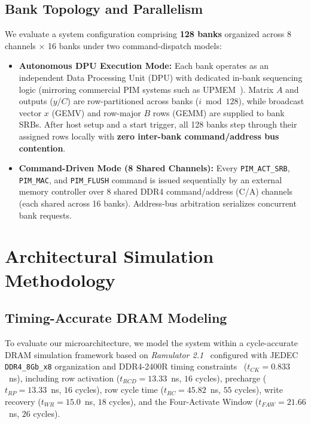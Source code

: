 \documentclass[conference]{IEEEtran}
\begin{document}
\subsection{Bank Topology and Parallelism}
We evaluate a system configuration comprising \textbf{128 banks} organized across 8 channels $\times$ 16 banks under two command-dispatch models:
\begin{itemize}
    \item \textbf{Autonomous DPU Execution Mode:} Each bank operates as an independent Data Processing Unit (DPU) with dedicated in-bank sequencing logic (mirroring commercial PIM systems such as UPMEM~\cite{devaux2019true}). Matrix $A$ and outputs ($y$/$C$) are row-partitioned across banks ($i \bmod 128$), while broadcast vector $x$ (GEMV) and row-major $B$ rows (GEMM) are supplied to bank SRBs. After host setup and a start trigger, all 128 banks step through their assigned rows locally with \textbf{zero inter-bank command/address bus contention}.
    \item \textbf{Command-Driven Mode (8 Shared Channels):} Every \texttt{PIM\_ACT\_SRB}, \texttt{PIM\_MAC}, and \texttt{PIM\_FLUSH} command is issued sequentially by an external memory controller over 8 shared DDR4 command/address (C/A) channels (each shared across 16 banks). Address-bus arbitration serializes concurrent bank requests.
\end{itemize}

\section{Architectural Simulation Methodology}
\label{sec:methodology}

\subsection{Timing-Accurate DRAM Modeling}
To evaluate our microarchitecture, we model the system within a cycle-accurate DRAM simulation framework based on \textit{Ramulator 2.1}~\cite{kim2016ramulator} configured with JEDEC \texttt{DDR4\_8Gb\_x8} organization and DDR4-2400R timing constraints~\cite{jedec2017ddr4} ($t_{CK} = 0.833$~ns), including row activation ($t_{RCD} = 13.33$~ns, $16$ cycles), precharge ($t_{RP} = 13.33$~ns, $16$ cycles), row cycle time ($t_{RC} = 45.82$~ns, $55$ cycles), write recovery ($t_{WR} = 15.0$~ns, $18$ cycles), and the Four-Activate Window ($t_{FAW} = 21.66$~ns, $26$ cycles).
\end{document}
